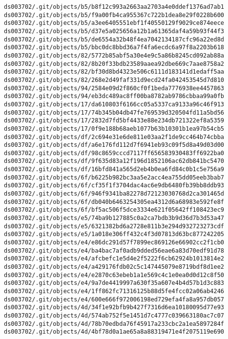 \documentclass[11pt]{article}
\begin{document}
\begin{Verbatim}[commandchars=\\\{\}]
ds003702/.git/objects/b5/b8f12c993a2663aa2703a4e0ddef1376ad7ab1
ds003702/.git/objects/b5/f9a00fb4ca955367c722b1dea8e29f0228b600
ds003702/.git/objects/b5/a3ee6405551ebf1f40550129f9029ce874eece
ds003702/.git/objects/b5/d37e5a025656a12b1a61365daf4a59b93f44f3
ds003702/.git/objects/b5/de6554a32b48f4ea7042134187cfc96a22ed8d
ds003702/.git/objects/b5/bbc0dc8bbd36a7f4fa6ecdc6a97f8a2203b618
ds003702/.git/objects/82/5772b85abf5a30e4e9c5a86b8245cd092ab88a
ds003702/.git/objects/82/8b20f33bdb23589aaea92dbe669c7aae8758a2
ds003702/.git/objects/82/bf30d8bd4323e506c6111d183141d1edaff5aa
ds003702/.git/objects/82/268e2d49faf331d9ecd24fa042453545d7d810
ds003702/.git/objects/94/2584e09d2f860cf0f1beda7776938ee4457863
ds003702/.git/objects/94/eb3dc489ac8ff00ba8782ab9786cbbaa99a0fb
ds003702/.git/objects/17/da610803f6166cc05a5337ca9133a96c46f913
ds003702/.git/objects/17/74b345b04db47fe769539d320504fd11a5bd56
ds003702/.git/objects/17/2832d7fd5bf4433e88e234db721322ef8a5359
ds003702/.git/objects/17/0f9e188b68aeb1077b63b10301b1ea97b54cb5
ds003702/.git/objects/df/2c694e31e6de811e03aa2f1de9cc464b74cbba
ds003702/.git/objects/df/a6e176fd112d7f6941eb93c09f5d8a49d03d00
ds003702/.git/objects/df/98c8659cccd7117ff656583930483ff6922ba0
ds003702/.git/objects/df/9f635d83a12f196d1852106ac62db841bc5470
ds003702/.git/objects/df/16bfd841a565d2eb4b0ea6fd84c0b1c5e756a9
ds003702/.git/objects/6f/b6225b982bc3aa5e2acc4ea755dd05eeb3bab7
ds003702/.git/objects/6f/cf35f1f3704dac4ac6e9db6480fb39bb8ddb93
ds003702/.git/objects/6f/946f9341ba82278d72123030768d2ca301465d
ds003702/.git/objects/6f/db040b6463254305ea4312d6a68983e592fe8f
ds003702/.git/objects/6f/bf5ac506f5dce3334e621f05642ff108423ec9
ds003702/.git/objects/e5/74ba9b127885c0a2ca7bdb3b9d36d7b3d53a47
ds003702/.git/objects/e5/6321382bd6a2728e811b3e294d932723273cdf
ds003702/.git/objects/e5/1a018e306ff432c4f3d07813d63bc877242205
ds003702/.git/objects/e4/e86dc291d57f7899ec869126e66902cc2f1cb0
ds003702/.git/objects/e4/ba4bac7af0adb9dded56eae6a83d70edf91d78
ds003702/.git/objects/e4/afcbefc1e5d4e2f5222f6cb62924b1013814e2
ds003702/.git/objects/e4/a429176fdb02c5c147445079e8719bdf8d1ee2
ds003702/.git/objects/e4/e2870c63ebeb1a1e569c4c1e0ea0d0d12c8f50
ds003702/.git/objects/e4/9a7de4419997a630f35a607e4b4d57b1d3c883
ds003702/.git/objects/e4/1ff862fc71316125b88d5fe4fcc02a06ab4246
ds003702/.git/objects/e4/600e666f972006198ed729efa4fa8a957db057
ds003702/.git/objects/4d/34f1e92bfb9b427f7316d6ea10180095d77e93
ds003702/.git/objects/4d/574ab752f5e1451d7c4777c039663180ac7c07
ds003702/.git/objects/4d/78b70edbda76f45917a233cbc2a1ea5897284f
ds003702/.git/objects/4d/4bf78d0a1ae65a8a88319471e4f2075119e690

\end{Verbatim}
\end{document}
